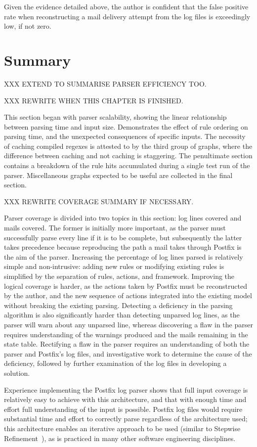 Given the evidence detailed above, the author is confident that the false
positive rate when reconstructing a mail delivery attempt from the
\numberOFlogFILES{} log files is exceedingly low, if not zero.

\section{Summary}

XXX EXTEND TO SUMMARISE PARSER EFFICIENCY TOO\@.

XXX REWRITE WHEN THIS CHAPTER IS FINISHED\@.

This section began with parser scalability, showing the linear relationship
between parsing time and input size.  Demonstrates the effect of rule
ordering on parsing time, and the unexpected consequences of specific
inputs.  The necessity of caching compiled regexes is attested to by the
third group of graphs, where the difference between caching and not caching
is staggering.  The penultimate section contains a breakdown of the rule
hits accumulated during a single test run of the parser.  Miscellaneous
graphs expected to be useful are collected in the final section.

XXX REWRITE COVERAGE SUMMARY IF NECESSARY\@.

Parser coverage is divided into two topics in this section: log lines
covered and mails covered.  The former is initially more important, as the
parser must successfully parse every line if it is to be complete, but
subsequently the latter takes precedence because reproducing the path a
mail takes through Postfix is the aim of the parser.  Increasing the
percentage of log lines parsed is relatively simple and non-intrusive:
adding new rules or modifying existing rules is simplified by the
separation of rules, actions, and framework.  Improving the logical
coverage is harder, as the actions taken by Postfix must be reconstructed
by the author, and the new sequence of actions integrated into the existing
model without breaking the existing parsing.  Detecting a deficiency in the
parsing algorithm is also significantly harder than detecting unparsed log
lines, as the parser will warn about any unparsed line, whereas discovering
a flaw in the parser requires understanding of the warnings produced and
the mails remaining in the state table.  Rectifying a flaw in the parser
requires an understanding of both the parser and Postfix's log files, and
investigative work to determine the cause of the deficiency, followed by
further examination of the log files in developing a solution.

Experience implementing the Postfix log parser shows that full input
coverage is relatively easy to achieve with this architecture, and that
with enough time and effort full understanding of the input is possible.
Postfix log files would require substantial time and effort to correctly
parse regardless of the architecture used; this architecture enables an
iterative approach to be used (similar to Stepwise
Refinement~\cite{stepwise-refinement}), as is practiced in many other
software engineering disciplines.
